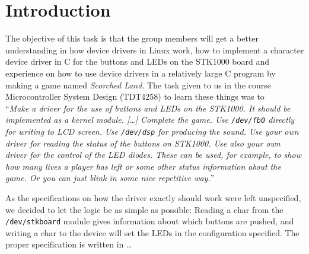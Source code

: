 \section{Introduction}

The objective of this task is that the group members will get a better
understanding in how device drivers in Linux work, how to implement a
character device driver in C for the buttons and LEDs on the STK1000
board and experience on how to use device drivers in a relatively large
C program by making a game named {\em Scorched Land}. The task given to
us in the course Microcontroller System Design (TDT4258) to learn these
things was to \\
``{\em Make a driver for the use of buttons and LEDs on the STK1000. It
should be implemented as a kernel module. [\ldots] Complete the game.
Use \texttt{/dev/fb0} directly for writing to LCD screen. Use
\texttt{/dev/dsp} for producing the sound. Use your own driver for
reading the status of the buttons on STK1000. Use also your own driver
for the control of the LED diodes.  These can be used, for example, to
show how many lives a player has left or some other status information
about the game. Or you can just blink in some nice repetitive
way.}''\cite{comp}

As the specifications on how the driver exactly should work were left
unspecified, we decided to let the logic be as simple as possible:
Reading a char from the \texttt{/dev/stkboard} module gives information
about which buttons are pushed, and writing a char to the device will
set the LEDs in the configuration specified. The proper specification is
written in \ldots %
\begin{comment}
\begin{itemize} %
\item Reading one char from the device will give you the bitmask of the
buttons pressed - for instance would 129 (\texttt{1000 0001}) mean that
only button 7 and 0 are pushed. 
\item Writing one char to the device will write the bitmask of the LEDs
in the same way you read the buttons pressed from the device - if you
write the char 66 (\texttt{0100 0010}) to the device, then LED 6 and 1
will be lit while the others will be turned off if they aren't already
off. Notice that there's no way to read the LEDs from the device, as
this was not a specification requirement. To do that in a program, we
would save the current configuration of the LEDs we just wrote.
\end{itemize}
\end{comment}

